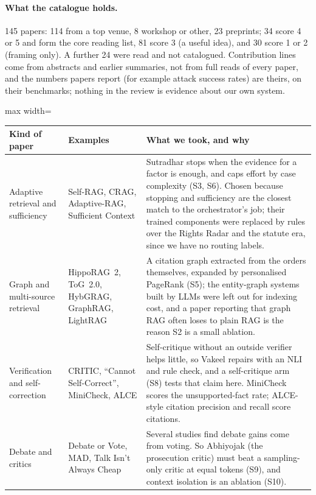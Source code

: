 \paragraph{What the catalogue holds.} 145 papers: 114 from a top venue, 8 workshop or other, 23 preprints; 34 score 4 or 5 and form the core reading list, 81 score 3 (a useful idea), and 30 score 1 or 2 (framing only). A further 24 were read and not catalogued. Contribution lines come from abstracts and earlier summaries, not from full reads of every paper, and the numbers papers report (for example attack success rates) are theirs, on their benchmarks; nothing in the review is evidence about our own system.

\begin{table}[!t]
\centering\small
\begin{adjustbox}{max width=\textwidth}
\begin{tabular}{@{}p{3.1cm}p{4.9cm}p{6.6cm}@{}}
\toprule
Kind of paper & Examples & What we took, and why \\
\midrule
Adaptive retrieval and sufficiency & Self-RAG, CRAG, Adaptive-RAG, Sufficient Context \citep{asai2024selfrag,yan2024crag,jeong2024adaptive,joren2025sufficient} & Sutradhar stops when the evidence for a factor is enough, and caps effort by case complexity (S3, S6). Chosen because stopping and sufficiency are the closest match to the orchestrator's job; their trained components were replaced by rules over the Rights Radar and the statute era, since we have no routing labels. \\
Graph and multi-source retrieval & HippoRAG~2, ToG~2.0, HybGRAG, GraphRAG, LightRAG & A citation graph extracted from the orders themselves, expanded by personalised PageRank (S5); the entity-graph systems built by LLMs were left out for indexing cost, and a paper reporting that graph RAG often loses to plain RAG is the reason S2 is a small ablation. \\
Verification and self-correction & CRITIC, ``Cannot Self-Correct'', MiniCheck, ALCE \citep{gou2024critic,huang2024selfcorrect,tang2024minicheck,gao2023alce} & Self-critique without an outside verifier helps little, so Vakeel repairs with an NLI and rule check, and a self-critique arm (S8) tests that claim here. MiniCheck scores the unsupported-fact rate; ALCE-style citation precision and recall score citations. \\
Debate and critics & Debate or Vote, MAD, Talk Isn't Always Cheap \citep{choi2025debate} & Several studies find debate gains come from voting. So Abhiyojak (the prosecution critic) must beat a sampling-only critic at equal tokens (S9), and context isolation is an ablation (S10). \\

\end{tabular}
\end{adjustbox}
\end{table}
